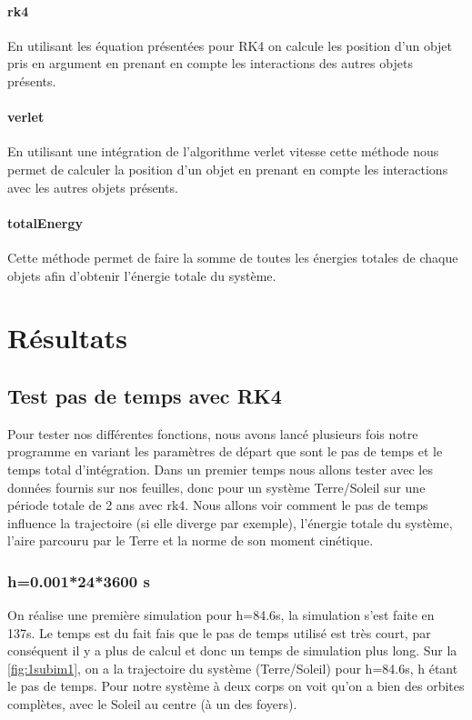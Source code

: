 \documentclass[11pt]{article}
\begin{document}
\paragraph{rk4 \break}
En utilisant les équation présentées pour RK4 on calcule les position d'un objet pris en argument en prenant en compte les interactions des autres objets présents.

\paragraph{verlet \break}
En utilisant une intégration de l'algorithme verlet vitesse cette méthode nous permet de calculer la position d'un objet en prenant en compte les interactions avec les autres objets présents.

\paragraph{totalEnergy \break}
Cette méthode permet de faire la somme de toutes les énergies totales de chaque objets afin d'obtenir l'énergie totale du système.


\section{Résultats}



\subsection{Test pas de temps avec RK4}

Pour tester nos différentes fonctions, nous avons lancé plusieurs fois notre programme en variant les paramètres de départ que sont le pas de temps et le temps total d'intégration. Dans un premier temps nous allons tester avec les données fournis sur nos feuilles, donc pour un système Terre/Soleil sur une période totale de 2 ans avec rk4. Nous allons voir comment le pas de temps influence la trajectoire (si elle diverge par exemple), l'énergie totale du système, l'aire parcouru par le Terre et la norme de son moment cinétique.


\subsubsection{h=0.001*24*3600 s}

On réalise une première simulation pour h=84.6s, la simulation s'est faite en 137s. Le temps est du fait fais que le pas de temps utilisé est très court, par conséquent il y a plus de calcul et donc un temps de simulation plus long. Sur la \ref{fig:1subim1}, on a la trajectoire du système (Terre/Soleil) pour h=84.6s, h étant le pas de temps. Pour notre système à deux corps on voit qu'on a bien des orbites complètes, avec le Soleil au centre (à un des foyers). 
\end{document}

